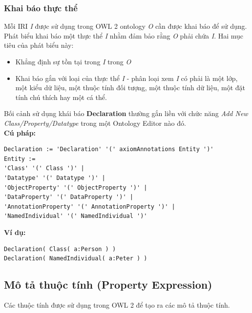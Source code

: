 \subsubsection{Khai báo thực thể}
Mỗi IRI \textit{I} được sử dụng trong OWL 2 ontology \textit{O} cần được khai báo để sử dụng. Phát biểu khai báo một thực thể \textit{I} nhằm đảm bảo rằng \textit{O} phải chứa \textit{I}. Hai mục tiêu của phát biểu này:
\begin{itemize}
\item Khẳng định sự tồn tại trong \textit{I} trong \textit{O}
\item Khai báo gắn với loại của thực thể \textit{I} - phân loại xem \textit{I} có phải là một lớp, một kiểu dữ liệu, một thuộc tính đối tượng, một thuộc tính dữ liệu, một đặt tính chú thích hay một cá thể.

\end{itemize}
Bối cảnh sử dụng khái báo \textbf{Declaration} thường gắn liền với chức năng \textit{Add New Class/Property/Datatype} trong một Ontology Editor nào đó.
\\ \textbf{Cú pháp:}
\begin{verbatim}
Declaration := 'Declaration' '(' axiomAnnotations Entity ')'
Entity :=
'Class' '(' Class ')' |
'Datatype' '(' Datatype ')' |
'ObjectProperty' '(' ObjectProperty ')' |
'DataProperty' '(' DataProperty ')' |
'AnnotationProperty' '(' AnnotationProperty ')' |
'NamedIndividual' '(' NamedIndividual ')'
\end{verbatim}
\textbf{Ví dụ:}
\begin{verbatim}
Declaration( Class( a:Person ) )
Declaration( NamedIndividual( a:Peter ) )
\end{verbatim}

\subsection{Mô tả thuộc tính (Property Expression)}
Các thuộc tính được sử dụng trong OWL 2 để tạo ra các mô tả thuộc tính.

